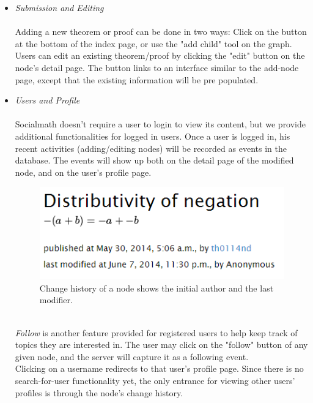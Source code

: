 \documentclass{acm_proc_article-sp}
\begin{document}
\begin{itemize}
\item \emph{Submission and Editing} \\\\
Adding a new theorem or proof can be done in two ways: 
Click on the button at the bottom of the index page, or use the "add child" tool on the graph. 
Users can edit an existing theorem/proof by clicking the "edit" button on the node's detail page. The button links to an interface similar to the add-node page, except that the existing information will be pre populated. 

\item \emph{Users and Profile} \\\\
Socialmath doesn't require a user to login to view its content, but we provide additional functionalities for logged in users. 
Once a user is logged in, his recent activities (adding/editing nodes) will be recorded as events in the database. The events will show up both on the detail page of the modified node, and on the user's profile page. \\
\begin{figure}[h!]
\centering
\includegraphics[scale=0.6]{edit_history.png}
\caption{Change history of a node shows the initial author and the last modifier.}
\end{figure}\\
\emph{Follow} is another feature provided for registered users to help keep track of topics they are interested in. The user may click on the "follow" button of any given node, and the server will capture it as a following event. \\
Clicking on a username redirects to that user's profile page. Since there is no search-for-user functionality yet, the only entrance for viewing other users' profiles is through the node's change history. 
\begin{figure}[h!]

\end{figure}
\end{itemize}
\end{document}
